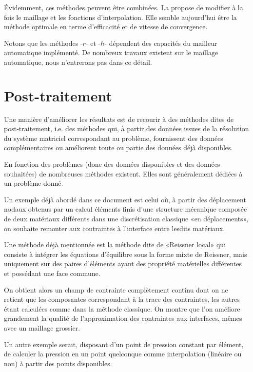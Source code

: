 \medskip
Évidemment, ces méthodes peuvent être combinées. La  propose de modifier à la fois le maillage et
les fonctions d'interpolation. Elle semble aujourd'hui être la méthode optimale en terme
d'efficacité et de vitesse de convergence.

Notons que les méthodes -$r$- et -$h$- dépendent des capacités du mailleur automatique implémenté. De nombreux travaux existent sur le maillage automatique, nous n'entrerons pas dans ce détail.

\medskip
\section{Post-traitement}\label{Sec-PT}

Une manière d'améliorer les résultats est de recourir à des méthodes dites de post-traitement, i.e. des méthodes qui, à partir des données issues de la résolution du système matriciel correspondant au problème, fournissent des données complémentaires ou améliorent toute ou partie des données déjà disponibles.

En fonction des problèmes (donc des données disponibles et des données souhaitées) de nombreuses méthodes existent. Elles sont généralement dédiées à un problème donné.

\medskip
Un exemple déjà abordé dans ce document est celui où, à partir des déplacement nodaux obtenus par un calcul éléments finis d'une structure mécanique composée de deux matériaux différents dans une discrétisation classique «en déplacements», on souhaite remonter aux contraintes à l'interface entre lesdits matériaux.

Une méthode déjà mentionnée est la méthode dite de «Reissner local» qui consiste à intégrer les équations d'équilibre sous la forme mixte de Reissner, mais uniquement sur des paires d'éléments ayant des propriété matérielles différentes et possédant une face commune.

On obtient alors un champ de contrainte complètement continu dont on ne retient que les composantes correspondant à la trace des contraintes, les autres étant calculées comme dans la méthode classique. On montre que l'on améliore grandement la qualité de l'approximation des contraintes aux interfaces, mêmes avec un maillage grossier.

\medskip
Un autre exemple serait, disposant d'un point de pression constant par élément, de calculer la pression en un point quelconque comme interpolation (linéaire ou non) à partir des points disponibles.

